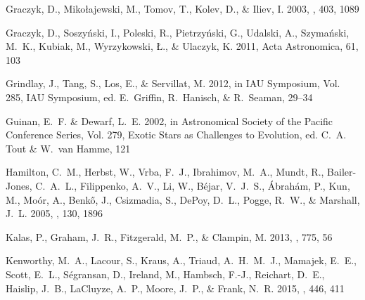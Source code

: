 \documentclass{emulateapj}
\newcommand{\actaa}{Acta Astronomica}
\begin{document}
\begin{thebibliography}{45}
{Graczyk}, D., {Miko{\l}ajewski}, M., {Tomov}, T., {Kolev}, D., \& {Iliev}, I.
  2003, \aap, 403, 1089

{Graczyk}, D., {Soszy{\'n}ski}, I., {Poleski}, R., {Pietrzy{\'n}ski}, G.,
  {Udalski}, A., {Szyma{\'n}ski}, M.~K., {Kubiak}, M., {Wyrzykowski}, {\L}., \&
  {Ulaczyk}, K. 2011, \actaa, 61, 103

{Grindlay}, J., {Tang}, S., {Los}, E., \& {Servillat}, M. 2012, in IAU
  Symposium, Vol. 285, IAU Symposium, ed. E.~{Griffin}, R.~{Hanisch}, \&
  R.~{Seaman}, 29--34

{Guinan}, E.~F. \& {Dewarf}, L.~E. 2002, in Astronomical Society of the Pacific
  Conference Series, Vol. 279, Exotic Stars as Challenges to Evolution, ed.
  C.~A. {Tout} \& W.~{van Hamme}, 121

{Hamilton}, C.~M., {Herbst}, W., {Vrba}, F.~J., {Ibrahimov}, M.~A., {Mundt},
  R., {Bailer-Jones}, C.~A.~L., {Filippenko}, A.~V., {Li}, W., {B{\'e}jar},
  V.~J.~S., {{\'A}brah{\'a}m}, P., {Kun}, M., {Mo{\'o}r}, A., {Benk{\H o}}, J.,
  {Csizmadia}, S., {DePoy}, D.~L., {Pogge}, R.~W., \& {Marshall}, J.~L. 2005,
  \aj, 130, 1896

{Kalas}, P., {Graham}, J.~R., {Fitzgerald}, M.~P., \& {Clampin}, M. 2013, \apj,
  775, 56

{Kenworthy}, M.~A., {Lacour}, S., {Kraus}, A., {Triaud}, A.~H.~M.~J.,
  {Mamajek}, E.~E., {Scott}, E.~L., {S{\'e}gransan}, D., {Ireland}, M.,
  {Hambsch}, F.-J., {Reichart}, D.~E., {Haislip}, J.~B., {LaCluyze}, A.~P.,
  {Moore}, J.~P., \& {Frank}, N.~R. 2015, \mnras, 446, 411


\end{thebibliography}
\end{document}
